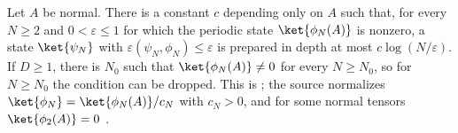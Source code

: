 \begin{theorem}
    \label{thm:ldp_depth_upper_bound}
    \leanok
    Let $A$ be normal. There is a constant $c$ depending only on $A$ such that,
    for every $N\ge2$ and $0<\varepsilon\le1$ for which the periodic state
    $\ket{\phi_N(A)}$ is nonzero, a state $\ket{\psi_N}$ with
    $\varepsilon(\psi_N,\phi_N)\le\varepsilon$ is prepared in depth at most
    $c\log(N/\varepsilon)$. If $D\ge1$, there is $N_0$ such that
    $\ket{\phi_N(A)}\neq0$ for every $N\ge N_0$, so for $N\ge N_0$ the condition can be dropped. This is
    \cite[eq.~(1)]{Malz2024Preparation}; the source normalizes
    $\ket{\phi_N}=\ket{\phi_N(A)}/c_N$ with $c_N>0$, and for some normal tensors
    $\ket{\phi_2(A)}=0$ \cite{gap:mswc24_depth_upper_bound_nonzero_state}.
\end{theorem}
